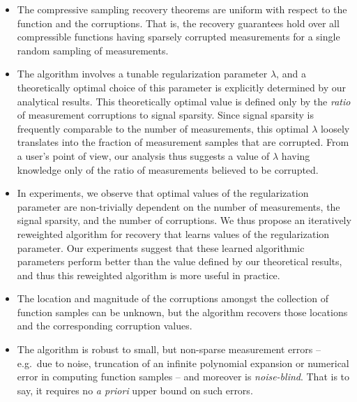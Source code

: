 \begin{itemize}
  \item The compressive sampling recovery theorems are uniform with respect to the function and the corruptions. That is, the recovery guarantees hold over all compressible functions having sparsely corrupted measurements for a single random sampling of measurements.
  \item The algorithm involves a tunable regularization parameter $\lambda$, and a theoretically optimal choice of this parameter is explicitly determined by our analytical results. This theoretically optimal value is defined only by the \textit{ratio} of measurement corruptions to signal sparsity. Since signal sparsity is frequently comparable to the number of measurements, this optimal $\lambda$ loosely translates into the fraction of measurement samples that are corrupted. From a user's point of view, our analysis thus suggests a value of $\lambda$ having knowledge only of the ratio of measurements believed to be corrupted.
  \item In experiments, we observe that optimal values of the regularization parameter are non-trivially dependent on the number of measurements, the signal sparsity, and the number of corruptions. We thus propose an iteratively reweighted algorithm for recovery that learns values of the regularization parameter. Our experiments suggest that these learned algorithmic parameters perform better than the value defined by our theoretical results, and thus this reweighted algorithm is more useful in practice. 
  \item The location and magnitude of the corruptions amongst the collection of function samples can be unknown, but the algorithm recovers those locations and the corresponding corruption values.
  \item The algorithm is robust to small, but non-sparse measurement errors -- e.g.\ due to noise, truncation of an infinite polynomial expansion or numerical error in computing function samples -- and moreover is \textit{noise-blind}.  That is to say, it requires no \textit{a priori} upper bound on such errors.

\end{itemize}
